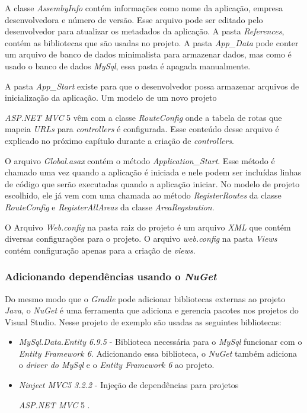\documentclass[a4paper,12pt]{article}
\newcommand{\anmvc} {
\sigla{ASP.NET MVC} 5
}
\newcommand{\est}[1] {
\textit{#1}}
\newcommand{\classe}[1] {
\textit{#1}}
\newcommand{\arquivo}[1] {
\textit{#1}}
\newcommand{\sigla}[1] {
\textit{#1}}
\newcommand{\lang}[1] {
\textit{#1}}
\newcommand{\lib}[1] {
\textit{#1}}
\newcommand{\metodo}[1] {
\textit{#1}}
\begin{document}
A classe \classe{AssembyInfo} contém informações como nome da aplicação, empresa desenvolvedora e número de versão. Esse arquivo pode ser editado pelo desenvolvedor para atualizar os metadados da aplicação. A pasta \est{References}, contém as bibliotecas que são usadas no projeto. A pasta \est{App\_Data} pode conter um arquivo de banco de dados minimalista para armazenar dados, mas como é usado o banco de dados \est{MySql}, essa pasta é apagada manualmente.

A pasta \est{App\_Start} existe para que o desenvolvedor possa armazenar arquivos de inicialização da aplicação. Um modelo de um novo projeto \anmvc vêm com a classe \classe{RouteConfig} onde a tabela de rotas que mapeia \sigla{URLs} para \est{controllers} é configurada. Esse conteúdo desse arquivo é explicado no próximo capítulo durante a criação de \est{controllers}.

O arquivo \arquivo{Global.asax} contém o método \metodo{Application\_Start}. Esse método é chamado uma vez quando a aplicação é iniciada e nele podem ser incluídas linhas de código que serão executadas quando a aplicação iniciar. No modelo de projeto escolhido, ele já vem com uma chamada ao método \metodo{RegisterRoutes} da classe \classe{RouteConfig} e \metodo{RegisterAllAreas} da classe \classe{AreaRegstration}.

O Arquivo \arquivo{Web.config} na pasta raiz do projeto é um arquivo \lang{XML} que contém diversas configurações para o projeto. O arquivo \arquivo{web.config} na pasta \est{Views} contém configuração apenas para a criação de \est{views}.

\subsubsection{Adicionando dependências usando o \est{NuGet}}

Do mesmo modo que o \est{Gradle} pode adicionar bibliotecas externas ao projeto \lang{Java}, o \est{NuGet} é uma ferramenta que adiciona e gerencia pacotes nos projetos do Visual Studio. Nesse projeto de exemplo são usadas as seguintes bibliotecas:

\begin{itemize}
  \item \lib{MySql.Data.Entity 6.9.5} - Biblioteca necessária para o \est{MySql} funcionar com o \est{Entity Framework 6}. Adicionando essa biblioteca, o \est{NuGet} também adiciona o \est{driver do MySql} e o \est{Entity Framework 6} ao projeto.
  \item \lib{Ninject MVC5 3.2.2} - Injeção de dependências para projetos \anmvc. 
\end{itemize}
\end{document}
